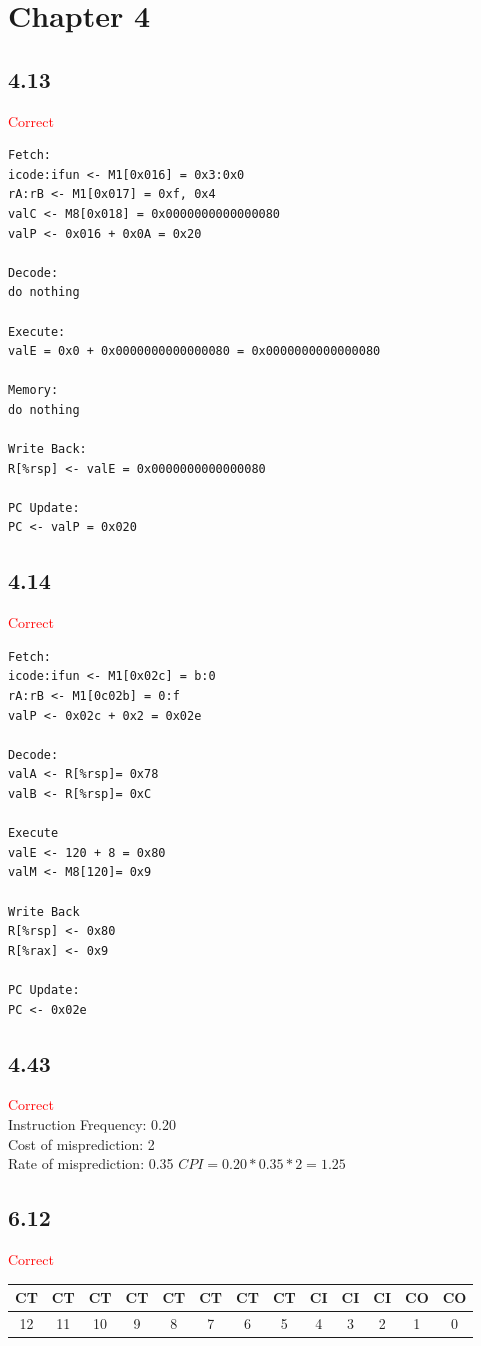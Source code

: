 \section*{Chapter 4}

\subsection*{4.13}
\textcolor{red}{Correct}
\begin{verbatim}
Fetch:
icode:ifun <- M1[0x016] = 0x3:0x0
rA:rB <- M1[0x017] = 0xf, 0x4
valC <- M8[0x018] = 0x0000000000000080
valP <- 0x016 + 0x0A = 0x20

Decode:
do nothing

Execute:
valE = 0x0 + 0x0000000000000080 = 0x0000000000000080

Memory:
do nothing

Write Back:
R[%rsp] <- valE = 0x0000000000000080

PC Update:
PC <- valP = 0x020
\end{verbatim}

\subsection*{4.14}
\textcolor{red}{Correct}
\begin{verbatim}
Fetch:
icode:ifun <- M1[0x02c] = b:0
rA:rB <- M1[0c02b] = 0:f
valP <- 0x02c + 0x2 = 0x02e

Decode:
valA <- R[%rsp]= 0x78
valB <- R[%rsp]= 0xC

Execute
valE <- 120 + 8 = 0x80
valM <- M8[120]= 0x9

Write Back
R[%rsp] <- 0x80
R[%rax] <- 0x9

PC Update:
PC <- 0x02e
\end{verbatim}

\subsection*{4.43}
\textcolor{red}{Correct}\\
Instruction Frequency: 0.20\\
Cost of misprediction: 2\\
Rate of misprediction: 0.35
$CPI=0.20*0.35*2=1.25$

\subsection*{6.12}
\textcolor{red}{Correct}\\
\begin{tabular}{|c|c|c|c|c|c|c|c|c|c|c|c|c|}
\hline
CT & CT & CT & CT & CT & CT & CT & CT & CI & CI & CI & CO & CO \\ \hline
12 & 11 & 10 & 9  & 8  & 7  & 6  & 5  & 4  & 3  & 2  & 1  & 0  \\ \hline
\end{tabular}

